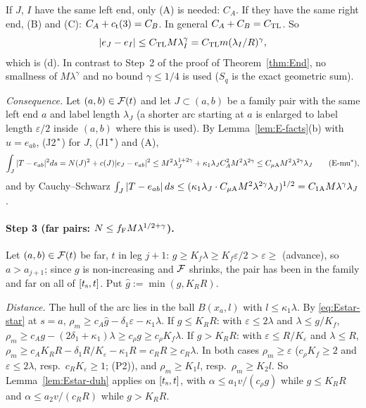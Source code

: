 If $J$, $I$ have the same left end, only (A) is needed: $C_A$. If they have the same right end, (B) and (C): $C_A+c_{\mathrm t}(3)=C_B$. In
general $C_A+C_B=C_{\mathrm{TL}}$. So
\begin{equation}\label{eq:Estar-TL}
|e_J-e_I|\le C_{\mathrm{TL}} M\lambda_I^\gamma=C_{\mathrm{TL}} m(\lambda_I/R)^\gamma ,
\end{equation}
which is (d). In contrast to Step~2 of the proof of Theorem~\ref{thm:End}, no smallness of $M\lambda^\gamma$ and no bound
$\gamma\le1/4$ is used ($S_q$ is the exact geometric sum).

\emph{Consequence.} Let $(a,b)\in\mathcal F(t)$ and let $J\subset(a,b)$ be a family pair with the same left end $a$ and label length
$\lambda_J$ (a shorter arc starting at $a$ is enlarged to label length $\varepsilon/2$ inside $(a,b)$ where this is used). By
Lemma~\ref{lem:E-facts}(b) with $\hat u=e_{ab}$, (J2$^{*}$) for $J$, (J1$^{*}$) and (A),
\begin{equation}\label{eq:Estar-mu}
\int_J|T-e_{ab}|^2ds=N(J)^2+c(J)|e_J-e_{ab}|^2\le M^2\lambda_J^{1+2\gamma}+\kappa_1\lambda_JC_A^2M^2\lambda^{2\gamma}
\le C_{\mu\mathrm A} M^2\lambda^{2\gamma}\lambda_J\qquad\text{(E-mu$^{*}$)},
\end{equation}
and by Cauchy--Schwarz $\int_J|T-e_{ab}|\,ds\le(\kappa_1\lambda_J\cdot C_{\mu\mathrm A} M^2\lambda^{2\gamma}\lambda_J)^{1/2}=C_{1\mathrm A} M\lambda^\gamma\lambda_J$.

\paragraph{Step 3 (far pairs: $N\le f_{\mathrm F} M\lambda^{1/2+\gamma}$).}
Let $(a,b)\in\mathcal F(t)$ be far, $t$ in leg $j+1$: $g\ge K_f\lambda\ge K_f\varepsilon/2>\varepsilon\ge$ (advance), so $a>a_{j+1}$; since
$g$ is non-increasing and $\mathcal F$ shrinks, the pair has been in the family and far on all of $[t_{\mathrm s},t]$. Put $\hat g:=\min(g,K_RR)$.

\emph{Distance.} The hull of the arc lies in the ball $B(x_a,l)$ with $l\le\kappa_1\lambda$. By \eqref{eq:Estar-star} at $s=a$,
$\rho_m\ge c_A\hat g-\delta_1\varepsilon-\kappa_1\lambda$.
If $g\le K_RR$: with $\varepsilon\le2\lambda$ and $\lambda\le g/K_f$, $\rho_m\ge c_Ag-(2\delta_1+\kappa_1)\lambda\ge c_\rho g\ge c_\rho K_f\lambda$.
If $g>K_RR$: with $\varepsilon\le R/K_\varepsilon$ and $\lambda\le R$, $\rho_m\ge c_AK_RR-\delta_1R/K_\varepsilon-\kappa_1R=c_RR\ge c_R\lambda$.
In both cases $\rho_m\ge\varepsilon$ ($c_\rho K_f\ge2$ and $\varepsilon\le2\lambda$, resp.\ $c_RK_\varepsilon\ge1$; \textup{(P2)}), and
$\rho_m\ge K_1l$, resp.\ $\rho_m\ge K_2l$. So Lemma~\ref{lem:Estar-duh} applies on $[t_{\mathrm s},t]$, with $\alpha\le a_1v/(c_\rho g)$ while
$g\le K_RR$ and $\alpha\le a_2v/(c_RR)$ while $g>K_RR$.


